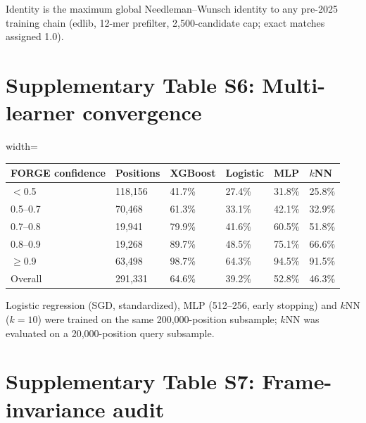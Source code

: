 \documentclass[pdflatex,sn-nature]{sn-jnl}
\begin{document}
Identity is the maximum global Needleman--Wunsch identity to any pre-2025 training chain (edlib, 12-mer prefilter, 2,500-candidate cap; exact matches assigned 1.0).

\section*{Supplementary Table S6: Multi-learner convergence}

\begingroup\footnotesize
\begin{adjustbox}{width=\textwidth}
\begin{tabular}{p{}p{}p{}p{}p{}p{}}
\toprule
FORGE confidence & Positions & XGBoost & Logistic & MLP & $k$NN \\
\midrule
$<$0.5 & 118,156 & 41.7\% & 27.4\% & 31.8\% & 25.8\% \\
0.5--0.7 & 70,468 & 61.3\% & 33.1\% & 42.1\% & 32.9\% \\
0.7--0.8 & 19,941 & 79.9\% & 41.6\% & 60.5\% & 51.8\% \\
0.8--0.9 & 19,268 & 89.7\% & 48.5\% & 75.1\% & 66.6\% \\
$\geq$0.9 & 63,498 & 98.7\% & 64.3\% & 94.5\% & 91.5\% \\
\midrule
Overall & 291,331 & 64.6\% & 39.2\% & 52.8\% & 46.3\% \\
\bottomrule
\end{tabular}
\end{adjustbox}
\endgroup

Logistic regression (SGD, standardized), MLP (512--256, early stopping) and $k$NN ($k=10$) were trained on the same 200,000-position subsample; $k$NN was evaluated on a 20,000-position query subsample.

\section*{Supplementary Table S7: Frame-invariance audit}
\end{document}
